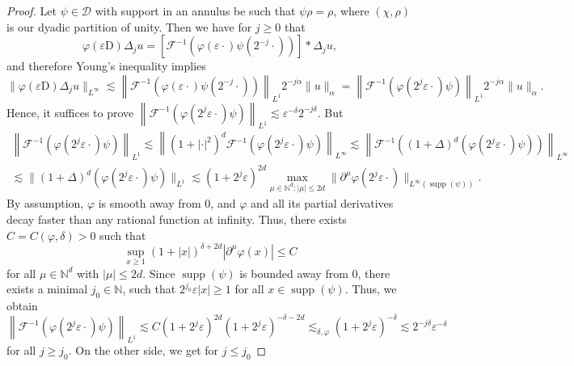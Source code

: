 \documentclass[11pt,a4paper]{article}
\newcommand{\cdummy}{\cdot}
\newcommand{\mathD}{\mathrm{D}}
\newcommand{\tmop}[1]{\ensuremath{\operatorname{#1}}}
\theoremstyle{remark}
\newcommand{\CD}{\ensuremath{\mathscr{D}}}
\newcommand{\CF}{\ensuremath{\mathscr{F}}}
\begin{document}
\begin{proof}
  Let $\psi \in \CD$ with support in an annulus be such that $\psi \rho = \rho$, where $( \chi , \rho )$ is our dyadic partition of unity. Then we have for $j \geqslant 0$ that
  \[
     \varphi ( \varepsilon \mathD ) \Delta_{j} u= \left[ \CF^{-1} ( \varphi (\varepsilon \cdummy ) \psi ( 2^{-j} \cdummy ) ) \right] \ast \Delta_{j}  u,
  \]
  and therefore Young's inequality implies
  \[
     \| \varphi ( \varepsilon \mathD ) \Delta_{j} u \|_{L^{\infty}} \lesssim \left\| \CF^{-1} ( \varphi ( \varepsilon \cdummy ) \psi ( 2^{-j} \cdummy ) ) \right\|_{L^{1}} 2^{-j \alpha} \| u \|_{\alpha} = \left\| \CF^{-1} ( \varphi ( 2^{j} \varepsilon \cdummy ) \psi ) \right\|_{L^{1}} 2^{-j \alpha} \| u \|_{\alpha}.
  \]
  Hence, it suffices to prove $\left\| \CF^{-1} ( \varphi ( 2^{j} \varepsilon \cdummy ) \psi ) \right\|_{L^{1}} \lesssim \varepsilon^{- \delta} 2^{-j \delta}$. But
  \begin{gather*}
     \left\| \CF^{-1} ( \varphi ( 2^{j} \varepsilon \cdummy ) \psi ) \right\|_{L^{1}} \lesssim \left\| ( 1+ | \cdot |^{2} )^{d} \CF^{-1} ( \varphi ( 2^{j} \varepsilon \cdummy ) \psi ) \right\|_{L^{\infty}}     \lesssim \left\| \CF^{-1} ( ( 1+ \Delta )^{d} ( \varphi ( 2^{j} \varepsilon \cdummy ) \psi ) ) \right\|_{L^{\infty}} \\
      \lesssim \| ( 1+ \Delta )^{d} ( \varphi ( 2^{j} \varepsilon \cdummy ) \psi ) \|_{L^{1}} \lesssim ( 1+2^{j} \varepsilon )^{2d} \max_{\mu \in \mathbb{N}^{d} : | \mu | \leqslant 2d} \| \partial^{\mu} \varphi ( 2^{j}  \varepsilon \cdot ) \|_{L^{\infty} ( \tmop{supp} ( \psi ) )} .
  \end{gather*}
  By assumption, $\varphi$ is smooth away from 0, and $\varphi$ and all its partial derivatives decay faster than any rational function at infinity. Thus, there exists $C=C(\varphi,\delta)>0$ such that
  \[
     \sup_{x \geqslant 1} ( 1+ | x | )^{\delta +2d} | \partial^{\mu} \varphi ( x ) | \leqslant C
  \]
  for all $\mu \in \mathbb{N}^{d}$ with $|\mu|\leqslant 2d$. Since $\tmop{supp} ( \psi )$ is bounded away from $0$, there exists a minimal $j_{0} \in \mathbb{N}$, such that $2^{j_{0}} \varepsilon | x | \geqslant 1$ for all $x \in \tmop{supp} ( \psi )$. Thus, we obtain
  \[
     \left\| \CF^{-1} ( \varphi ( 2^{j} \varepsilon \cdummy ) \psi ) \right\|_{L^{1}} \lesssim C ( 1+2^{j} \varepsilon )^{2d} ( 1+2^{j}\varepsilon )^{- \delta -2d} \lesssim_{\delta , \varphi} ( 1+2^{j} \varepsilon )^{- \delta} \lesssim 2^{-j \delta} \varepsilon^{- \delta}
  \]
  for all $j \geqslant j_{0}$. On the other side, we get for $j \leqslant j_{0}$

\end{proof}
\end{document}
